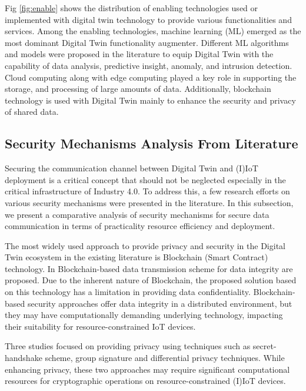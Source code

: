 Fig \ref{fig:enable} shows the distribution of enabling technologies used or implemented with digital twin technology to provide various functionalities and services. Among the enabling technologies, machine learning (ML) emerged as the most dominant Digital Twin functionality augmenter. Different ML algorithms and models were proposed in the literature to equip Digital Twin with the capability of data analysis, predictive insight, anomaly, and intrusion detection. Cloud computing along with edge computing played a key role in supporting the storage, and processing of large amounts of data. Additionally, blockchain technology is used with Digital Twin mainly to enhance the security and privacy of shared data.


\subsection{Security Mechanisms Analysis From Literature}
Securing the communication channel between Digital Twin and (I)IoT deployment is a critical concept that should not be neglected especially in the critical infrastructure of Industry 4.0. To address this, a few research efforts on various security mechanisms were presented in the literature. In this subsection, we present a comparative analysis of security mechanisms for secure data communication in terms of practicality resource efficiency and deployment. 

The most widely used approach to provide privacy and security in the Digital Twin ecosystem in the existing literature is Blockchain (Smart Contract) technology. In \cite{kumarBlockchainDeepLearning2022, salimBlockchainEnabledSecureDigital2022, zhengBlockchainBasedTrustworthy2022a, liuBlockchainBasedSecureCommunication2022a, danilczykBlockchainChecksumEstablishing2021a, chenDigitalTwinBasedHeuristic2023a} Blockchain-based data transmission scheme for data integrity are proposed. Due to the inherent nature of Blockchain, the proposed solution based on this technology has a limitation in providing data confidentiality. Blockchain-based security approaches offer data integrity in a distributed environment, but they may have computationally demanding underlying technology, impacting their suitability for resource-constrained IoT devices.

Three studies \cite{xuEfficientAuthenticationVehicular2021, wuDeepLearningDriven2022, chengzhelaiSPDTSecurePrivacyPreserving2022, pervezSIGNEDSmartCIty2023a} focused on providing privacy using techniques such as secret-handshake scheme, group signature and differential privacy techniques. While enhancing privacy, these two approaches may require significant computational resources for cryptographic operations on resource-constrained (I)IoT devices.

